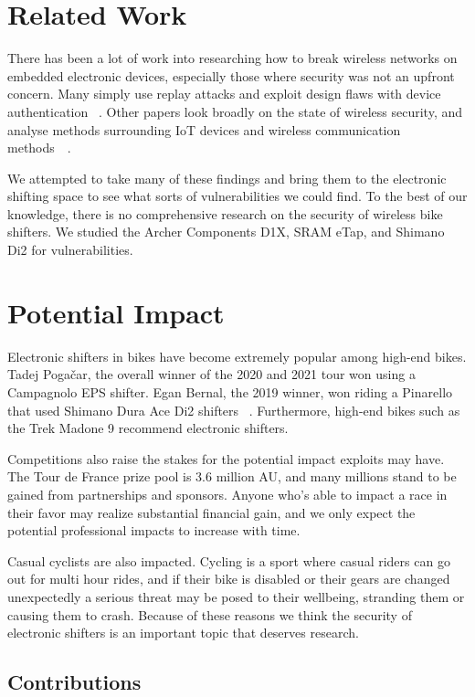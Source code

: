 \documentclass[letterpaper,twocolumn,10pt]{article}
\begin{document}
\section{Related Work}

There has been a lot of work into researching how to break wireless networks on embedded electronic devices, especially those where security was not an upfront concern. Many simply use replay attacks and exploit design flaws with device authentication~ \cite{Halperin}. Other papers look broadly on the state of wireless security, and analyse methods surrounding IoT devices and wireless communication methods~\cite{Choi}~\cite{Radek}.

We attempted to take many of these findings and bring them to the electronic shifting space to see what sorts of vulnerabilities we could find. To the best of our knowledge, there is no comprehensive research on the security of wireless bike shifters. We studied the Archer Components D1X, SRAM eTap, and Shimano Di2 for vulnerabilities.

\section{Potential Impact}

Electronic shifters in bikes have become extremely popular among high-end bikes. Tadej Pogačar, the overall winner of the 2020 and 2021 tour won using a Campagnolo EPS shifter. Egan Bernal, the 2019 winner, won riding a Pinarello that used Shimano Dura Ace Di2 shifters~ \cite{GCNTech}. Furthermore, high-end bikes such as the Trek Madone 9 recommend electronic shifters.

Competitions also raise the stakes for the potential impact exploits may have. The Tour de France prize pool is 3.6 million AU, and many millions stand to be gained from partnerships and sponsors. Anyone who's able to impact a race in their favor may realize substantial financial gain, and we only expect the potential professional impacts to increase with time.

Casual cyclists are also impacted. Cycling is a sport where casual riders can go out for multi hour rides, and if their bike is disabled or their gears are changed unexpectedly a serious threat may be posed to their wellbeing, stranding them or causing them to crash. Because of these reasons we think the security of electronic shifters is an important topic that deserves research.

\subsection{Contributions}
\end{document}
